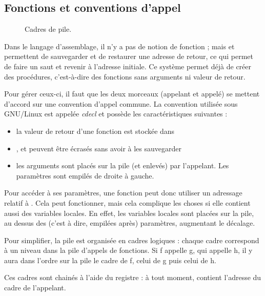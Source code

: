 \subsection{Fonctions et conventions d'appel}
\label{sec:convappel}

\begin{figure} %

\caption[Cadres de pile]{ Cadres de pile. }
\label{fig:stackframe}
\end{figure} %


Dans le langage d'assemblage, il n'y a pas de notion de fonction ; mais
 et  permettent de sauvegarder et de restaurer une
adresse de retour, ce qui permet de faire un saut et revenir à l'adresse initiale.
Ce système permet déjà de créer des procédures, c'est-à-dire des fonctions sans
arguments ni valeur de retour.

Pour gérer ceux-ci, il faut que les deux morceaux (appelant et appelé) se
mettent d'accord sur une convention d'appel commune. La convention utilisée sous
GNU/Linux est appelée \emph{cdecl} et possède les caractéristiques suivantes :

\begin{itemize}
\item la valeur de retour d'une fonction est stockée dans \eax
\item \eax, \ecx et \edx peuvent être écrasés sans avoir à les sauvegarder
\item les arguments sont placés sur la pile (et enlevés) par l'appelant. Les
  paramètres sont empilés de droite à gauche.
\end{itemize}

Pour accéder à ses paramètres, une fonction peut donc utiliser un adressage
relatif à \esp. Cela peut fonctionner, mais cela complique les choses si elle
contient aussi des variables locales. En effet, les variables locales sont
placées sur la pile, au dessus des (c'est à dire, empilées après) paramètres,
augmentant le décalage.

Pour simplifier, la pile est organisée en cadres logiques : chaque cadre
correspond à un niveau dans la pile d'appels de fonctions. Si f appelle g, qui
appelle h, il y aura dans l'ordre sur la pile le cadre de f, celui de g puis
celui de h.

Ces cadres sont chainés à l'aide du registre \ebp : à tout moment, \ebp contient
l'adresse du cadre de l'appelant.

